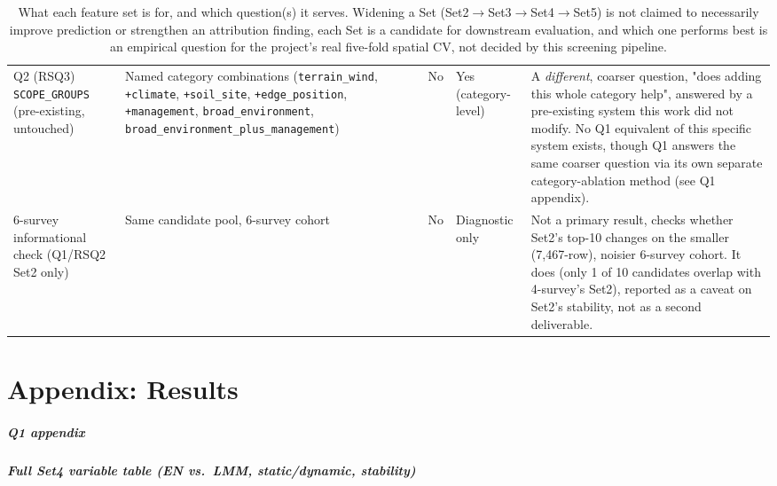 \documentclass[logo,msc,ai]{infthesis}           %
\begin{document}
\begin{table}[H]
\begin{tabularx}{\linewidth}{@{} p{2.6cm} >{\hsize=0.75\hsize\raggedright\arraybackslash}X p{2.1cm} p{1.5cm} >{\hsize=1.25\hsize\raggedright\arraybackslash}X @{}}
Q2 (RSQ3) \texttt{SCOPE\_GROUPS} (pre-existing, untouched) & Named category combinations (\texttt{terrain\_wind}, \texttt{+climate}, \texttt{+soil\_site}, \texttt{+edge\_position}, \texttt{+management}, \texttt{broad\_environment}, \texttt{broad\_environment\_plus\_management}) & No & Yes (category-level) & A \emph{different}, coarser question, "does adding this whole category help", answered by a pre-existing system this work did not modify. No Q1 equivalent of this specific system exists, though Q1 answers the same coarser question via its own separate category-ablation method (see Q1 appendix). \\
6-survey informational check (Q1/RSQ2 Set2 only) & Same candidate pool, 6-survey cohort & No & Diagnostic only & Not a primary result, checks whether Set2's top-10 changes on the smaller (7,467-row), noisier 6-survey cohort. It does (only 1 of 10 candidates overlap with 4-survey's Set2), reported as a caveat on Set2's stability, not as a second deliverable. \\
\bottomrule
\end{tabularx}
\caption{\small{What each feature set is for, and which question(s) it serves. Widening a Set (Set2$\to$Set3$\to$Set4$\to$Set5) is not claimed to necessarily improve prediction or strengthen an attribution finding, each Set is a candidate for downstream evaluation, and which one performs best is an empirical question for the project's real five-fold spatial CV, not decided by this screening pipeline.}}
\label{tab:feature-set-purpose}
\end{table}


\chapter{Appendix: Results}

\paragraph*{Q1 appendix}
\label{app:results-q1}

\paragraph*{Full Set4 variable table (EN vs.\ LMM, static/dynamic, stability)}
\label{app:nonlinearity-check}
\end{document}

